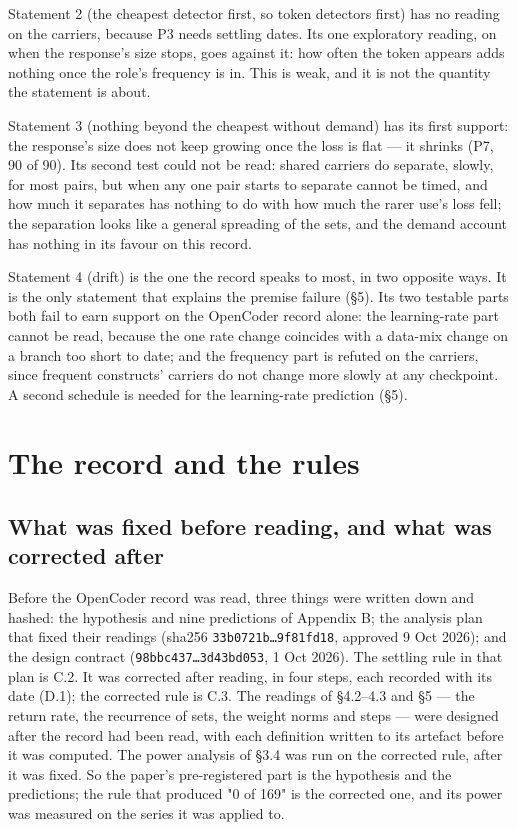 \documentclass{article}
\begin{document}
Statement 2 (the cheapest detector first, so token detectors first) has no reading on the carriers, because P3 needs settling dates. Its one exploratory reading, on when the response's size stops, goes against it: how often the token appears adds nothing once the role's frequency is in. This is weak, and it is not the quantity the statement is about.

Statement 3 (nothing beyond the cheapest without demand) has its first support: the response's size does not keep growing once the loss is flat --- it shrinks (P7, 90 of 90). Its second test could not be read: shared carriers do separate, slowly, for most pairs, but when any one pair starts to separate cannot be timed, and how much it separates has nothing to do with how much the rarer use's loss fell; the separation looks like a general spreading of the sets, and the demand account has nothing in its favour on this record.

Statement 4 (drift) is the one the record speaks to most, in two opposite ways. It is the only statement that explains the premise failure (\S5). Its two testable parts both fail to earn support on the OpenCoder record alone: the learning-rate part cannot be read, because the one rate change coincides with a data-mix change on a branch too short to date; and the frequency part is refuted on the carriers, since frequent constructs' carriers do not change more slowly at any checkpoint. A second schedule is needed for the learning-rate prediction (\S5).


\section{The record and the rules}

\subsection{What was fixed before reading, and what was corrected after}

Before the OpenCoder record was read, three things were written down and hashed: the hypothesis and nine predictions of Appendix B; the analysis plan that fixed their readings (sha256 \texttt{33b0721b\ldots{}9f81fd18}, approved 9 Oct 2026); and the design contract (\texttt{98bbc437\ldots{}3d43bd053}, 1 Oct 2026). The settling rule in that plan is C.2. It was corrected after reading, in four steps, each recorded with its date (D.1); the corrected rule is C.3. The readings of \S4.2--4.3 and \S5 --- the return rate, the recurrence of sets, the weight norms and steps --- were designed after the record had been read, with each definition written to its artefact before it was computed. The power analysis of \S3.4 was run on the corrected rule, after it was fixed. So the paper's pre-registered part is the hypothesis and the predictions; the rule that produced "0 of 169" is the corrected one, and its power was measured on the series it was applied to.
\end{document}
